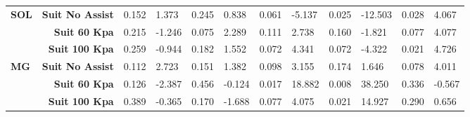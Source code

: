 \documentclass[letterpaper, 10 pt, conference]{ieeeconf}  %
\begin{document}
\begin{table*}[]
\begin{tabular}{@{}lrllllllllll@{}}
		\textbf{SOL}                         & \textbf{Suit No Assist}                 & 0.152                                & 1.373                                & 0.245                                & 0.838                                & 0.061                                & -5.137                               & 0.025                                & -12.503                              & 0.028                                & 4.067                                \\
		\textbf{}                            & \textbf{Suit 60 Kpa}                    & 0.215                                & -1.246                               & 0.075                                & 2.289                                & 0.111                                & 2.738                                & 0.160                                & -1.821                               & 0.077                                & 4.077                                \\
		\textbf{}                            & \textbf{Suit 100 Kpa}                   & 0.259                                & -0.944                               & 0.182                                & 1.552                                & 0.072                                & 4.341                                & 0.072                                & -4.322                               & 0.021                                & 4.726                                \\ \midrule
		\textbf{MG}                          & \textbf{Suit No Assist}                 & 0.112                                & 2.723                                & 0.151                                & 1.382                                & 0.098                                & 3.155                                & 0.174                                & 1.646                                & 0.078                                & 4.011                                \\
		\textbf{}                            & \textbf{Suit 60 Kpa}                    & 0.126                                & -2.387                               & 0.456                                & -0.124                               & 0.017                                & 18.882                               & 0.008                                & 38.250                               & 0.336                                & -0.567                               \\
		\textbf{}                            & \textbf{Suit 100 Kpa}                   & 0.389                                & -0.365                               & 0.170                                & -1.688                               & 0.077                                & 4.075                                & 0.021                                & 14.927                               & 0.290                                & 0.656                                \\ \midrule

\end{tabular}
\end{table*}
\end{document}
